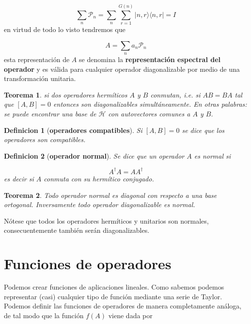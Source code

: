 \documentclass[12pt]{book}
\numberwithin{equation}{chapter}
\numberwithin{figure}{chapter}
\newtheorem{theorem}{Teorema}[section]
\newtheorem{definition}{Definicion}[section]
\begin{document}
\begin{equation}
\sum_n \mathcal{P}_n = \sum_n \sum_{r=1}^{G(n)} | n ,r \rangle \langle n,r| = I 
\end{equation}
en virtud de todo lo visto tendremos que

\begin{equation}
A = \sum_n a_n \mathcal{P}_n
\end{equation}
esta representación de $A$ se denomina la \textbf{representación espectral del operador} y es válida para cualquier operador diagonalizable por medio de una transformación unitaria.

\begin{theorem}
si dos operadores hermíticos $A$ y $B$ conmutan, i.e. si $AB = BA$ tal que $[A,B]=0$ entonces son diagonalizables simultáneamente. En otras palabras: se puede encontrar una base de $\mathcal{H}$ con autovectores comunes a $A$ y $B$. 
\end{theorem}

\begin{definition}[\textbf{operadores compatibles}]
Si $[A,B]=0$ se dice que los operadores son compatibles.
\end{definition}
\begin{definition}[\textbf{operador normal}] 
Se dice que un operador $A$ es normal si 
 
\begin{equation}
A^\dagger A = A A^\dagger
\end{equation}
es decir si $A$ conmuta con su hermítico conjugado. 
\end{definition}

\begin{theorem}
Todo operador normal es diagonal con respecto a una base ortogonal. Inversamente todo operador diagonalizable es normal.
\end{theorem}
Nótese que todos los operadores hermíticos y unitarios son normales, consecuentemente también serán diagonalizables. 


\section{Funciones de operadores}

Podemos crear funciones de aplicaciones lineales. Como sabemos podemos representar (casi) cualquier tipo de función mediante una serie de Taylor. Podemos definir las funciones de operadores de manera completamente análoga, de tal modo que la función $f(A)$ viene dada por
\end{document}
